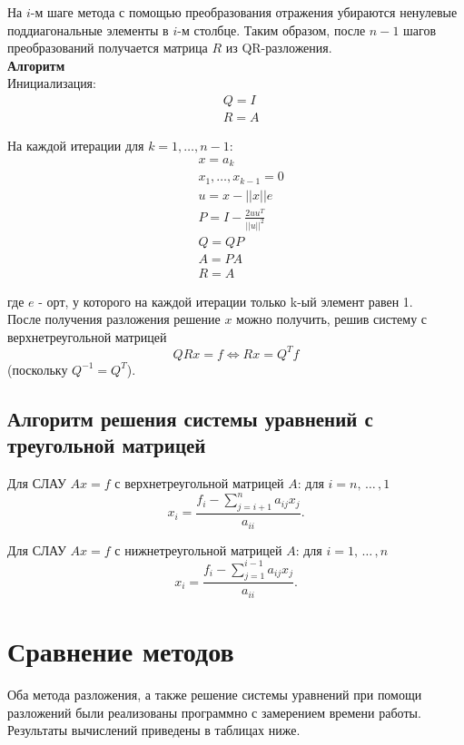 \documentclass[a4paper,12pt,titlepage,finall]{article}
\begin{document}
На $i$-м шаге метода с помощью преобразования отражения убираются ненулевые поддиагональные элементы в $i$-м столбце. Таким образом, после $n-1$ шагов преобразований получается матрица $R$ из QR-разложения.\\

{\large \bf Алгоритм}\\

Инициализация:
\[\begin{aligned}&Q = I\\
&R = A\end{aligned}\]

На каждой итерации для $k = 1, \ldots, n - 1$:
\[\displaystyle {\begin{aligned}&x = a_k \\&x_1, \ldots ,x_{k-1} = 0 \\&u = x - ||x|| e\\&P = I - \frac{2uu^{T}}{||u||^2}\\&Q = QP\\&A = PA\\&R = A\end{aligned}}\]

где $e$ - орт, у которого на каждой итерации только k-ый элемент равен 1.\\

После получения разложения решение $x$ можно получить, решив систему с верхнетреугольной матрицей \[QRx=f \iff Rx=Q^{T}f\] (поскольку $Q^{-1}=Q^T$).

\subsection{Алгоритм решения системы уравнений с треугольной матрицей}

Для СЛАУ $Ax=f$ с верхнетреугольной матрицей $A$: для $i = n,\,\ldots\,,1$
\[x_i=\frac{f_i-\displaystyle\sum_{j=i+1}^{n} a_{ij}x_j}{a_{ii}}.\]

Для СЛАУ $Ax=f$ с нижнетреугольной матрицей $A$: для $i = 1,\,\ldots\,,n$
\[x_i=\frac{f_i-\displaystyle\sum_{j=1}^{i - 1} a_{ij}x_j}{a_{ii}}.\]

\section{Сравнение методов}

Оба метода разложения, а также решение системы уравнений при помощи разложений были реализованы программно с замерением времени работы. Результаты вычислений приведены в таблицах ниже.
\end{document}
